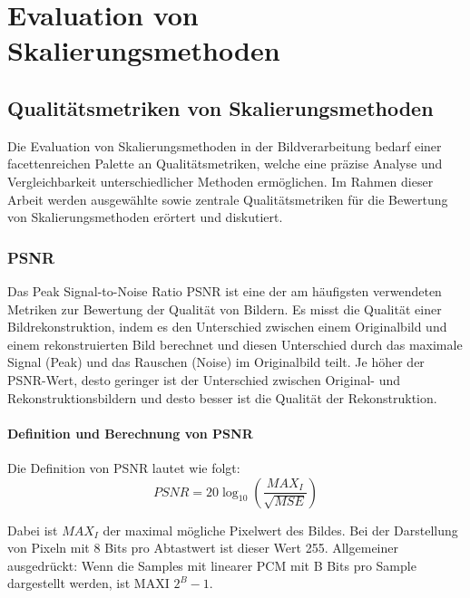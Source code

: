 

\chapter{Evaluation von Skalierungsmethoden}

\section{Qualitätsmetriken von Skalierungsmethoden}

    Die Evaluation von Skalierungsmethoden in der Bildverarbeitung bedarf einer facettenreichen Palette an Qualitätsmetriken, welche eine präzise Analyse und Vergleichbarkeit unterschiedlicher Methoden ermöglichen. 
    Im Rahmen dieser Arbeit werden ausgewählte sowie zentrale Qualitätsmetriken für die Bewertung von Skalierungsmethoden erörtert und diskutiert.

    \subsection{\ac{PSNR}}
        Das Peak Signal-to-Noise Ratio \ac{PSNR} ist eine der am häufigsten verwendeten Metriken zur Bewertung der Qualität von Bildern. 
        Es misst die Qualität einer Bildrekonstruktion, indem es den Unterschied zwischen einem Originalbild und einem rekonstruierten Bild berechnet und diesen Unterschied durch das maximale Signal (Peak) und das Rauschen (Noise) im Originalbild teilt. 
        Je höher der PSNR-Wert, desto geringer ist der Unterschied zwischen Original- und Rekonstruktionsbildern und desto besser ist die Qualität der Rekonstruktion.
        
        \subsubsection{Definition und Berechnung von \ac{PSNR}}
            Die Definition von PSNR lautet wie folgt:
            \begin{equation}
            PSNR = 20 \log_{10} \left( \frac{MAX_I}{\sqrt{MSE}} \right) 
            \end{equation}

            Dabei ist $MAX_I$ der maximal mögliche Pixelwert des Bildes.
            Bei der Darstellung von Pixeln mit 8 Bits pro Abtastwert ist dieser Wert 255.
            Allgemeiner ausgedrückt: Wenn die Samples mit linearer PCM mit B Bits pro Sample dargestellt werden, ist MAXI $2^B - 1$.
            
